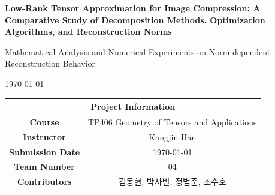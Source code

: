 \begin{titlepage}
  \thispagestyle{empty}
  
  \begin{center}

    \vspace*{3cm}

    {\LARGE\bfseries
        Low-Rank Tensor Approximation for Image Compression: A Comparative Study of Decomposition Methods, Optimization Algorithms, and Reconstruction Norms
    }

    \vspace{1.2em}

    {\large
      Mathematical Analysis and Numerical Experiments on Norm-dependent Reconstruction Behavior
    }

    \vspace{3cm}

    {\large \today}

    \vfill
    
    \begin{table}[h]
      \centering
      \renewcommand{\arraystretch}{1.5} %
      \begin{tabular}{|c || c|}
        \hline \hline
        \multicolumn{2}{|c|}{\textbf{Project Information}} \\ \hline \hline
        \textbf{Course}       & TP406 Geometry of Tensors and Applications \\ \hline
        \textbf{Instructor}   & Kangjin Han \\ \hline
        \textbf{Submission Date} & \today \\ \hline
        \textbf{Team Number} & 04 \\ \hline
        \textbf{Contributors} & 김동현, 박사빈, 정범준, 조수호 \\ \hline \hline
      \end{tabular}
    \end{table}
    
    \vspace{1cm} %

  \end{center}
\end{titlepage}